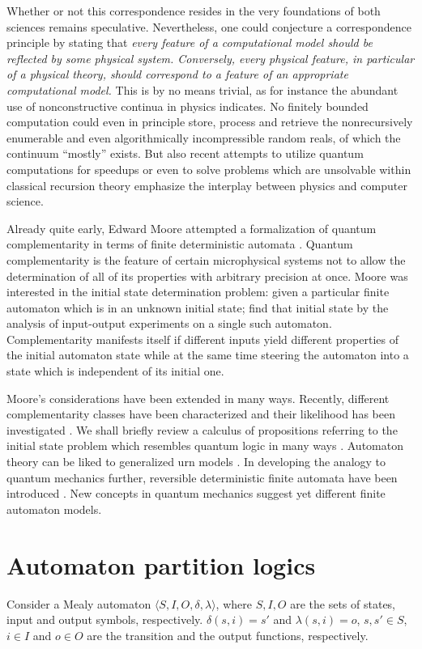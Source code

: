 \documentclass{llncs}
\begin{document}
Whether or not this correspondence resides in the very foundations of both sciences
remains speculative. Nevertheless, one could conjecture a correspondence principle by
stating that
{\em every feature of a computational model should be reflected by some physical system.
Conversely, every physical feature, in particular of a physical theory,
should correspond to a feature of an appropriate
computational model.}
This is by no means trivial, as for instance the abundant use of nonconstructive continua
in physics indicates.
No finitely bounded computation could even in principle store, process
and retrieve the nonrecursively enumerable
and even algorithmically incompressible random reals,
of which the continuum ``mostly'' exists.
But also recent attempts to utilize quantum computations for speedups or even to solve
problems which are unsolvable within classical recursion theory \cite{2002-cal-pav}
emphasize the interplay between
physics and computer science.


Already quite early, Edward Moore attempted a formalization of quantum complementarity
in terms of finite deterministic automata \cite{e-f-moore}.
Quantum complementarity is the feature of certain microphysical systems
not to allow the determination of all of its properties with arbitrary precision at once.
Moore was interested in the initial state determination problem: given
a particular finite automaton which is in an unknown initial state; find that
initial state by the analysis of input-output experiments on a single such automaton.
Complementarity manifests itself if different inputs yield different properties
of the initial automaton state while at the same time steering the automaton into
a state which is independent of its initial one.

Moore's considerations have been extended in many ways.
Recently, different complementarity classes have been characterized
\cite{cal-sv-yu} and their likelihood  has been
investigated \cite{e-calude-lip,cal-cal-k}.
We shall briefly review
a calculus of propositions referring to the initial state problem
which resembles quantum logic in many ways \cite{svozil-93,svozil-ql}.
Automaton theory can be liked to generalized urn models
\cite{svozil-2001-eua}.
In developing the analogy to quantum mechanics further,
reversible deterministic finite automata have been introduced
\cite{sv-aut-rev}.
New concepts in quantum mechanics \cite{zeil-99} suggest
yet different finite automaton models.




\section{Automaton partition logics}
Consider a Mealy automaton
$\langle S,I,O,\delta ,\lambda \rangle$, where
 $S,I,O$ are the sets of states,
input and output symbols, respectively.
$\delta (s,i)=s'$ and
$\lambda (s,i)=o$,
$s,s'\in S$,
$i\in I$
and $o\in O$
are the transition and the output functions, respectively.
\end{document}
